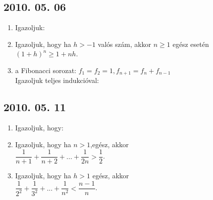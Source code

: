 \subsection*{2010. 05. 06}
\begin{enumerate}
\item Igazoljuk:
\item Igazoljuk, hogy ha $h>-1$ valós szám, akkor $n\ge1$ egész esetén $(1+h)^{n}\ge1+nh$.
\item a Fibonacci sorozat: $f_{1}=f_{2}=1,  f_{n+1}=f_{n}+f_{n-1}$\\
Igazoljuk teljes indukcióval:
\end{enumerate}


\subsection*{2010. 05. 11}
\begin{enumerate}
\item Igazoljuk, hogy:
\item Igazoljuk, hogy ha $n>1$,egész, akkor\\
$\dfrac{1}{n+1}+\dfrac{1}{n+2}+...+\dfrac{1}{2n}>\dfrac{1}{2}$.
\item Igazoljuk, hogy ha $h>1$ egész, akkor\\
$\dfrac{1}{2^{2}}+\dfrac{1}{3^{2}}+...+\dfrac{1}{n^{2}}<\dfrac{n-1}{n}$.
\end{enumerate}


